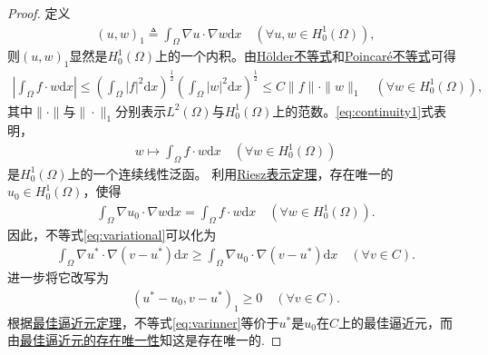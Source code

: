 \documentclass[../../main.tex]{subfiles}%
\begin{document}
\begin{proof}
定义
\begin{align*}
(u,w)_1\triangleq\int_\Omega \nabla u\cdot\nabla w\mathrm{d}x\quad (\forall u,w\in H_0^1(\Omega)),
\end{align*}
则$(u,w)_1$显然是$H_0^1(\Omega)$上的一个内积。由\hyperref[Real Analysis-theorem:实变函数--Hölder不等式]{Hölder不等式}和\hyperref[lemma:(庞加莱)Poincaré不等式]{Poincaré不等式}可得
\begin{align}
\left|\int_\Omega f\cdot w\mathrm{d}x\right|\leqslant\left(\int_\Omega |f|^2\mathrm{d}x\right)^{\frac{1}{2}}\left(\int_\Omega |w|^2\mathrm{d}x\right)^{\frac{1}{2}}
\leqslant C\|f\|\cdot\|w\|_1\quad (\forall w\in H_0^1(\Omega)),
\label{eq:continuity1}
\end{align}
其中$\|\cdot\|$与$\|\cdot\|_1$分别表示$L^2(\Omega)$与$H_0^1(\Omega)$上的范数。\eqref{eq:continuity1}式表明，
\begin{align*}
w\mapsto\int_\Omega f\cdot w\mathrm{d}x\quad (\forall w\in H_0^1(\Omega))
\end{align*}
是$H_0^1(\Omega)$上的一个连续线性泛函。
利用\hyperref[theorem:Riesz表示定理(Hilbert空间)]{Riesz表示定理}，存在唯一的$u_0\in H_0^1(\Omega)$，使得
\begin{align}
\int_\Omega \nabla u_0\cdot\nabla w\mathrm{d}x=\int_\Omega f\cdot w\mathrm{d}x\quad (\forall w\in H_0^1(\Omega)).
\label{eq:rieszvar}
\end{align}
因此，不等式\eqref{eq:variational}可以化为
\begin{align*}
\int_\Omega \nabla u^*\cdot\nabla(v-u^*)\mathrm{d}x\geqslant\int_\Omega \nabla u_0\cdot\nabla(v-u^*)\mathrm{d}x\quad (\forall v\in C).
\end{align*}
进一步将它改写为
\begin{align}
(u^*-u_0,v-u^*)_1\geqslant 0\quad (\forall v\in C).
\label{eq:varinner}
\end{align}
根据\hyperref[theorem:泛函分析--最佳逼近元的刻画]{最佳逼近元定理}，不等式\eqref{eq:varinner}等价于$u^*$是$u_0$在$C$上的最佳逼近元，而由\hyperref[corollary:泛函分析--最佳逼近元的存在唯一性]{最佳逼近元的存在唯一性}知这是存在唯一的.
\end{proof}
\end{document}
